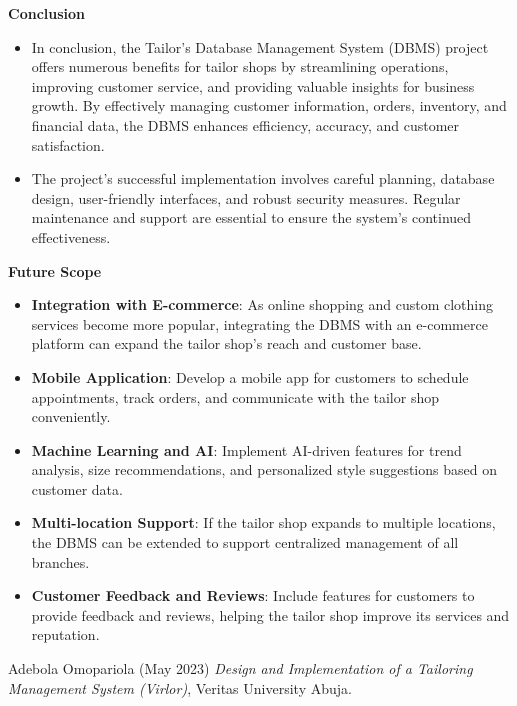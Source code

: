 \documentclass[12pt, letter paper]{report}
\begin{document}
{\textbf{Conclusion} 
\begin{spacing}{1.5}
\begin{itemize}
 \item {In conclusion, the Tailor's Database Management System (DBMS) project offers numerous benefits for tailor shops by streamlining operations, improving customer service, and providing valuable insights for business growth. By effectively managing customer information, orders, inventory, and financial data, the DBMS enhances efficiency, accuracy, and customer satisfaction.}
 \item {The project's successful implementation involves careful planning, database design, user-friendly interfaces, and robust security measures. Regular maintenance and support are essential to ensure the system's continued effectiveness.}
\end{itemize}
\textbf{Future Scope} 
\begin{itemize}
 \item {\textbf{Integration with E-commerce}: As online shopping and custom clothing services become more popular, integrating the DBMS with an e-commerce platform can expand the tailor shop's reach and customer base.}

\item{\textbf{Mobile Application}: Develop a mobile app for customers to schedule appointments, track orders, and communicate with the tailor shop conveniently.}

\item{\textbf{Machine Learning and AI}: Implement AI-driven features for trend analysis, size recommendations, and personalized style suggestions based on customer data.}

\item{\textbf{Multi-location Support}: If the tailor shop expands to multiple locations, the DBMS can be extended to support centralized management of all branches.}

\item{\textbf{Customer Feedback and Reviews}: Include features for customers to provide feedback and reviews, helping the tailor shop improve its services and reputation.}
\end{itemize}
\end{spacing}

\begin{thebibliography}{7}
\begin{spacing}{1.5}
Adebola Omopariola (May 2023)\emph{ Design and Implementation of a Tailoring Management System (Virlor)}, Veritas University Abuja.


\end{spacing}
\end{thebibliography}}
\end{document}
